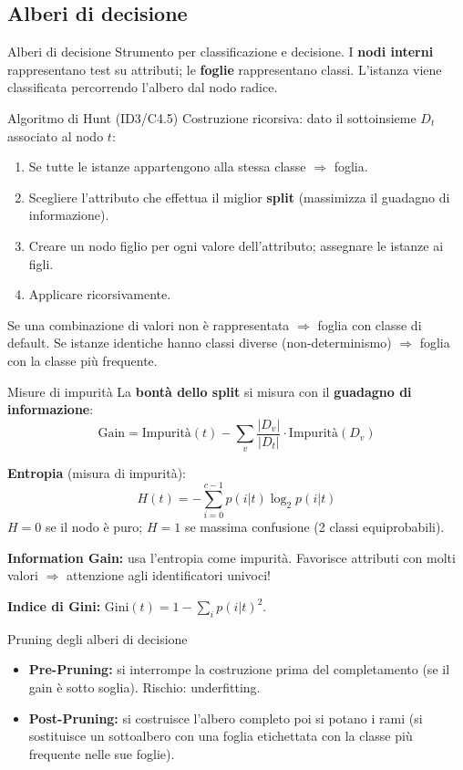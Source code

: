 \documentclass[12pt,a4paper]{article}
\begin{document}
\subsection{Alberi di decisione}

\begin{defbox}{Alberi di decisione}
Strumento per classificazione e decisione. I \textbf{nodi interni} rappresentano test su attributi; le \textbf{foglie} rappresentano classi. L'istanza viene classificata percorrendo l'albero dal nodo radice.
\end{defbox}

\begin{thmbox}{Algoritmo di Hunt (ID3/C4.5)}
Costruzione ricorsiva: dato il sottoinsieme $D_t$ associato al nodo $t$:
\begin{enumerate}[noitemsep]
  \item Se tutte le istanze appartengono alla stessa classe $\Rightarrow$ foglia.
  \item Scegliere l'attributo che effettua il miglior \textbf{split} (massimizza il guadagno di informazione).
  \item Creare un nodo figlio per ogni valore dell'attributo; assegnare le istanze ai figli.
  \item Applicare ricorsivamente.
\end{enumerate}
Se una combinazione di valori non è rappresentata $\Rightarrow$ foglia con classe di default. Se istanze identiche hanno classi diverse (non-determinismo) $\Rightarrow$ foglia con la classe più frequente.
\end{thmbox}

\begin{formulabox}{Misure di impurità}
La \textbf{bontà dello split} si misura con il \textbf{guadagno di informazione}:
\[
\text{Gain} = \text{Impurità}(t) - \sum_{v} \frac{|D_v|}{|D_t|} \cdot \text{Impurità}(D_v)
\]

\textbf{Entropia} (misura di impurità):
\[
H(t) = -\sum_{i=0}^{c-1} p(i|t) \log_2 p(i|t)
\]
$H = 0$ se il nodo è puro; $H = 1$ se massima confusione (2 classi equiprobabili).

\textbf{Information Gain:} usa l'entropia come impurità. Favorisce attributi con molti valori $\Rightarrow$ attenzione agli identificatori univoci!

\textbf{Indice di Gini:} $\text{Gini}(t) = 1 - \sum_i p(i|t)^2$.
\end{formulabox}

\begin{defbox}{Pruning degli alberi di decisione}
\begin{itemize}[noitemsep]
  \item \textbf{Pre-Pruning:} si interrompe la costruzione prima del completamento (se il gain è sotto soglia). Rischio: underfitting.
  \item \textbf{Post-Pruning:} si costruisce l'albero completo poi si potano i rami (si sostituisce un sottoalbero con una foglia etichettata con la classe più frequente nelle sue foglie).
\end{itemize}
\end{defbox}
\end{document}

